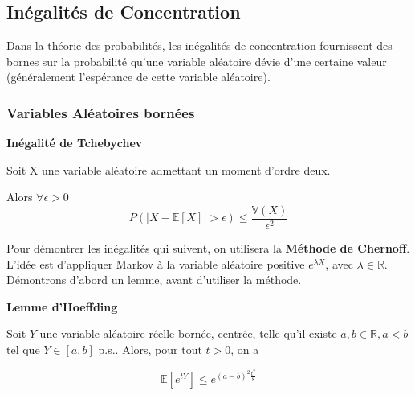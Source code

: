 \documentclass[12pt]{article}
\newif\ifcorrection
\newcommand{\corr}[1]{\ifcorrection{\color{lightblue}#1\color{black}}\fi}
\newcommand{\espace}{\vspace{1.5em}}
\newcommand{\petitespace}{\vspace{0.5cm}}
\newcommand{\bb}[1]{\mathbb{#1}} %
\newcommand{\R}{\bb{R}} %
\newcommand{\esp}[1]{\bb{ E} \mathopen{}\left[#1\right]} %
\newcommand{\1}{\bb{1}} %
\begin{document}
\espace

\subsection{Inégalités de Concentration}\espace

Dans la théorie des probabilités, les inégalités de concentration fournissent des bornes sur la probabilité qu'une variable aléatoire dévie d'une certaine valeur (généralement l'espérance de cette variable aléatoire).

\subsubsection{Variables Aléatoires bornées}

\espace

\textbf{Inégalité de Tchebychev } \petitespace

Soit X une variable aléatoire admettant un moment d'ordre deux.

Alors $\forall \epsilon >0$ $$P(\lvert X-\esp{X}\rvert > \epsilon) \le \frac{\bb{V}(X)}{\epsilon^2}$$

\petitespace

\corr{

On prend $Y=( X-\esp{X})^2$ Alors selon l'inégalité de Markov, comme Y est positive, on a :\petitespace

$\forall \epsilon^2$ ($\epsilon >0$) $P(Y>\epsilon^2) \le \frac{\esp{Y}}{\epsilon^2} \iff P(( X-\esp{X})^2>\epsilon^2) \le \frac{\esp{( X-\esp{X})^2}}{\epsilon^2}$\petitespace

donc $P(\lvert X-\esp{X}\rvert > \epsilon) \le \frac{\bb{V}(X)}{\epsilon^2}$ \petitespace
}
\espace

Pour démontrer les inégalités qui suivent, on utilisera la \textbf{Méthode de Chernoff}. L'idée est d’appliquer Markov à la variable aléatoire positive $e^{\lambda X}$, avec $\lambda \in \R$. Démontrons d'abord un lemme, avant d'utiliser la méthode. \espace




\textbf{Lemme d'Hoeffding}

Soit $Y$ une variable aléatoire réelle bornée, centrée, telle qu'il existe $a,b \in \R, a<b$ tel que $Y \in [a,b]$ p.s.. Alors, pour tout $t>0$, on a 

$$\esp{e^{tY}}\le e^{(a-b)^2\frac{t^2}{8}} $$

\petitespace
\end{document}
